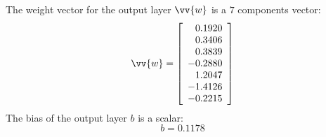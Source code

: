 \documentclass[twoside,english,1p,final,sort&compress]{elsarticle}
\theoremstyle{plain}
\renewcommand{\overrightarrow}{\vv}
\begin{document}
The weight vector for the output layer $\overrightarrow{w}$ is a $7$ components vector:
\begin{equation*}
\overrightarrow{w} = \left[
\begin{array}{r}
0.1920\\ 
0.3406\\ 
0.3839\\ 
-0.2880\\ 
1.2047\\ 
-1.4126\\ 
-0.2215\\ 
\end{array}\right]
\end{equation*}
The bias of the output layer $b$ is a scalar:
\begin{equation*}
b = 0.1178 
\end{equation*}
\end{document}
